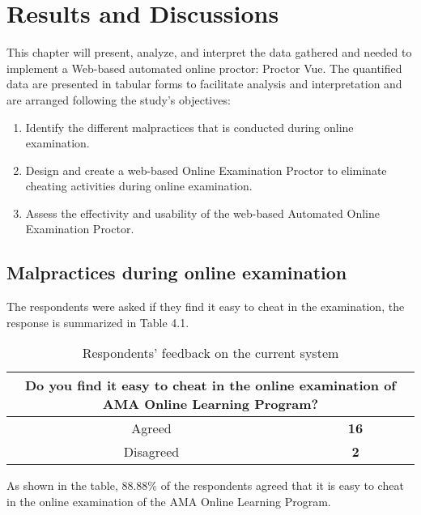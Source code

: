 \chapter{Results and Discussions}

This chapter will present, analyze, and interpret the data gathered and needed to implement a Web-based automated online proctor: Proctor Vue.
The quantified data are presented in tabular forms to facilitate analysis and interpretation and are arranged following the study's objectives:

\begin{enumerate}
   \item Identify the different malpractices that is conducted during online examination.
   \item Design and create a web-based Online Examination Proctor to eliminate cheating activities during online examination.
   \item Assess the effectivity and usability of the web-based Automated Online Examination Proctor.
\end{enumerate}

\section{Malpractices during online examination}

The respondents were asked if they find it easy to cheat in the examination, the response is summarized in Table 4.1.

\begin{table}[h!]
   \begin{center}
      \begin{tabular}{|c|c|}
         \hline
         \multicolumn{2}{|m{20em}|}{Do you find it easy to cheat in the online examination of AMA Online Learning Program?} \\
         \hline
         Agreed    & \textbf{16}                                                                                            \\
         \hline
         Disagreed & \textbf{2}                                                                                             \\
         \hline
      \end{tabular}
   \end{center}
   \caption{Respondents' feedback on the current system}
\end{table}

As shown in the table, 88.88\% of the respondents agreed that it is easy to cheat in the online examination of the AMA Online Learning Program.

